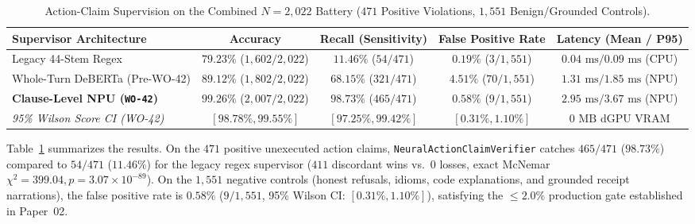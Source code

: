 \documentclass[11pt,a4paper]{article}
\begin{document}
\begin{table}[h]
\centering
\caption{Action-Claim Supervision on the Combined $N=2{,}022$ Battery ($471$ Positive Violations, $1{,}551$ Benign/Grounded Controls).}
\label{tab:large_sample_2022}
\begin{tabular}{lcccc}
\toprule
\textbf{Supervisor Architecture} & \textbf{Accuracy} & \textbf{Recall (Sensitivity)} & \textbf{False Positive Rate} & \textbf{Latency (Mean / P95)} \\
\midrule
Legacy 44-Stem Regex \cite{maxwell2026evasion} & $79.23\%$ ($1{,}602/2{,}022$) & $11.46\%$ ($54/471$) & $\mathbf{0.19\%}$ ($3/1{,}551$) & $0.04\text{ ms} / 0.09\text{ ms}$ (CPU) \\
Whole-Turn DeBERTa (Pre-WO-42) & $89.12\%$ ($1{,}802/2{,}022$) & $68.15\%$ ($321/471$) & $4.51\%$ ($70/1{,}551$) & $1.31\text{ ms} / 1.85\text{ ms}$ (NPU) \\
\textbf{Clause-Level NPU (\texttt{WO-42})} & $\mathbf{99.26\%}$ ($2{,}007/2{,}022$) & $\mathbf{98.73\%}$ ($465/471$) & $0.58\%$ ($9/1{,}551$) & $2.95\text{ ms} / 3.67\text{ ms}$ (NPU) \\
\midrule
\emph{95\% Wilson Score CI (WO-42)} & $[98.78\%, 99.55\%]$ & $[97.25\%, 99.42\%]$ & $[0.31\%, 1.10\%]$ & $0\text{ MB}$ dGPU VRAM \\
\bottomrule
\end{tabular}
\end{table}

Table~\ref{tab:large_sample_2022} summarizes the results. On the $471$ positive unexecuted action claims, \texttt{NeuralActionClaimVerifier} catches $465/471$ ($98.73\%$) compared to $54/471$ ($11.46\%$) for the legacy regex supervisor ($411$ discordant wins vs.\ $0$ losses, exact McNemar $\chi^2 = 399.04, p = 3.07 \times 10^{-89}$). On the $1{,}551$ negative controls (honest refusals, idioms, code explanations, and grounded receipt narrations), the false positive rate is $0.58\%$ ($9/1{,}551$, 95\% Wilson CI: $[0.31\%, 1.10\%]$), satisfying the $\le 2.0\%$ production gate established in Paper~02.
\end{document}
